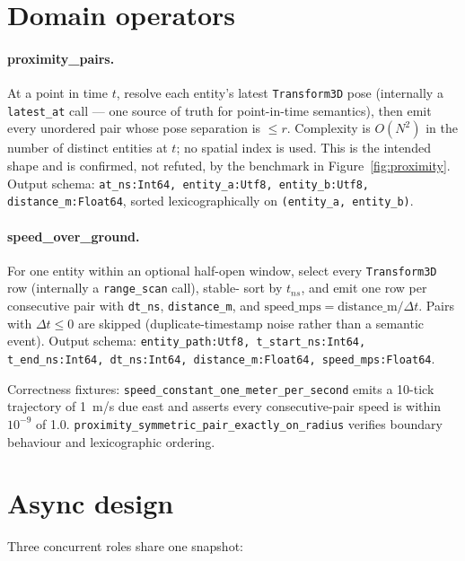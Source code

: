 \documentclass[11pt]{article}
\begin{document}
\section{Domain operators}

\paragraph{proximity\_pairs.} At a point in time $t$, resolve each entity's latest
\texttt{Transform3D} pose (internally a \texttt{latest\_at} call --- one source of
truth for point-in-time semantics), then emit every unordered pair whose pose
separation is $\le r$. Complexity is $O(N^2)$ in the number of distinct entities at
$t$; no spatial index is used. This is the intended shape and is confirmed, not
refuted, by the benchmark in Figure~\ref{fig:proximity}. Output schema:
\texttt{at\_ns:Int64, entity\_a:Utf8, entity\_b:Utf8, distance\_m:Float64}, sorted
lexicographically on \texttt{(entity\_a, entity\_b)}.

\paragraph{speed\_over\_ground.} For one entity within an optional half-open window,
select every \texttt{Transform3D} row (internally a \texttt{range\_scan} call), stable-
sort by $t_{ns}$, and emit one row per consecutive pair with \texttt{dt\_ns},
\texttt{distance\_m}, and $\mathrm{speed\_mps} = \mathrm{distance\_m}/\Delta t$. Pairs
with $\Delta t \le 0$ are skipped (duplicate-timestamp noise rather than a semantic
event). Output schema: \texttt{entity\_path:Utf8, t\_start\_ns:Int64, t\_end\_ns:Int64,
dt\_ns:Int64, distance\_m:Float64, speed\_mps:Float64}.

Correctness fixtures: \texttt{speed\_constant\_one\_meter\_per\_second} emits a
10-tick trajectory of 1~m/s due east and asserts every consecutive-pair speed is
within $10^{-9}$ of 1.0. \texttt{proximity\_symmetric\_pair\_exactly\_on\_radius}
verifies boundary behaviour and lexicographic ordering.

\section{Async design}

Three concurrent roles share one snapshot:
\end{document}
